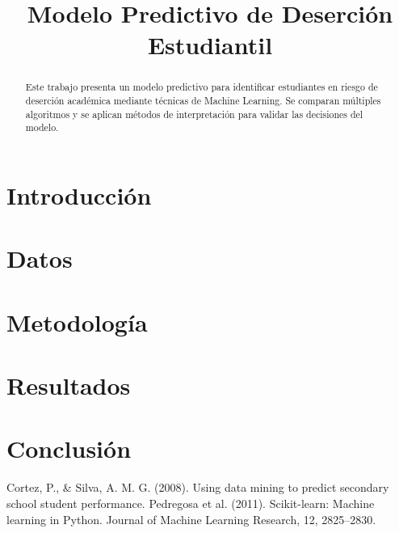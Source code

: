 \documentclass[10pt, conference]{IEEEtran}
\title{Modelo Predictivo de Deserción Estudiantil}
\author{
    \IEEEauthorblockN{Equipo 1}
    \IEEEauthorblockA{Universidad Ejemplo, Departamento de Ciencia de Datos}
}
\begin{document}
\maketitle

\begin{abstract}
Este trabajo presenta un modelo predictivo para identificar estudiantes en riesgo de deserción académica mediante técnicas de Machine Learning. 
Se comparan múltiples algoritmos y se aplican métodos de interpretación para validar las decisiones del modelo.
\end{abstract}

\section{Introducción}

\section{Datos}

\section{Metodología}

\section{Resultados}

\section{Conclusión}


\begin{thebibliography}{9}
 Cortez, P., \& Silva, A. M. G. (2008). Using data mining to predict secondary school student performance.
 Pedregosa et al. (2011). Scikit-learn: Machine learning in Python. Journal of Machine Learning Research, 12, 2825–2830.
\end{thebibliography}
\end{document}
